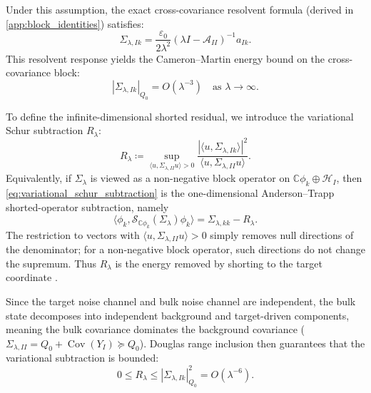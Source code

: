\documentclass[preprint,12pt]{elsarticle}
\theoremstyle{plain}
\theoremstyle{definition}
\theoremstyle{remark}
\begin{document}
    Under this assumption, the exact cross-covariance resolvent formula (derived in \ref{app:block_identities}) satisfies:
    \begin{equation}
        \Sigma_{\lambda,Ik} = \frac{\varepsilon_0}{2\lambda^2} (\lambda I - \mathcal{A}_{II})^{-1} a_{Ik}.
    \end{equation}
    This resolvent response yields the Cameron--Martin energy bound on the cross-covariance block:
    \begin{equation}
        \label{eq:cross_norm_bound}
        |\Sigma_{\lambda,Ik}|_{Q_0} = O(\lambda^{-3}) \quad \text{as } \lambda \to \infty.
    \end{equation}

    To define the infinite-dimensional shorted residual, we introduce the variational Schur subtraction $R_\lambda$:
    \begin{equation}
        \label{eq:variational_schur_subtraction}
        R_\lambda \coloneqq \sup_{\langle u, \Sigma_{\lambda,II} u \rangle > 0} \frac{|\langle u, \Sigma_{\lambda,Ik} \rangle|^2}{\langle u, \Sigma_{\lambda,II} u \rangle}.
    \end{equation}
    Equivalently, if $\Sigma_\lambda$ is viewed as a non-negative block operator on $\mathbb{C}\phi_k\oplus\mathcal{H}_I$, then \eqref{eq:variational_schur_subtraction} is the one-dimensional Anderson--Trapp shorted-operator subtraction, namely
    \begin{equation}
        \label{eq:shorted_operator_scalar}
        \big\langle \phi_k,\mathcal{S}_{\mathbb{C}\phi_k}(\Sigma_\lambda)\phi_k\big\rangle
        =\Sigma_{\lambda,kk}-R_\lambda.
    \end{equation}
    The restriction to vectors with $\langle u,\Sigma_{\lambda,II}u\rangle>0$ simply removes null directions of the denominator; for a non-negative block operator, such directions do not change the supremum. Thus $R_\lambda$ is the energy removed by shorting to the target coordinate \cite{anderson1975shorted,owhadi2015conditioning,contino2021matrix,naikjohnson2024complementable}.

    Since the target noise channel and bulk noise channel are independent, the bulk state decomposes into independent background and target-driven components, meaning the bulk covariance dominates the background covariance ($\Sigma_{\lambda,II} = Q_0 + \operatorname{Cov}(Y_I) \succeq Q_0$). Douglas range inclusion then guarantees that the variational subtraction is bounded:
    \begin{equation}
        0 \le R_\lambda \le |\Sigma_{\lambda,Ik}|_{Q_0}^2 = O(\lambda^{-6}).
    \end{equation}
\end{document}
